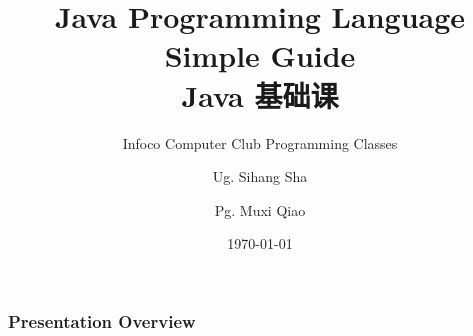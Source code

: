 \documentclass[
  11pt, %
  xcolor=dvipsnames
]{beamer}
\title[Java Sec.2]{Java Programming Language Simple Guide \\ Java 基础课} %
\subtitle{Infoco Computer Club Programming Classes \\ } %
\author[SSH. \and MXQ. (TA)]{Ug. Sihang Sha \and Pg. Muxi Qiao} %
\institute[XJTLU InfoCo Club]{Xiann' Jiaotong Livepool University \\ \smallskip \textit{infoco@xjtlu.edu.cn}} %
\date[\today]{\today} %
\begin{document}

\begin{frame}
	\titlepage %

\end{frame}




\begin{frame}[allowframebreaks]
	\frametitle{Presentation Overview} %

	\tableofcontents %

\end{frame}

\end{document}
